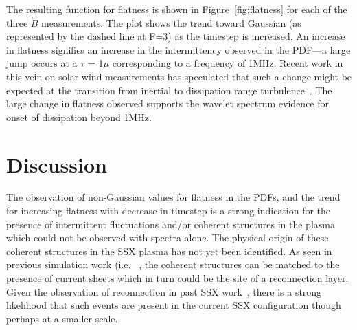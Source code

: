 \documentclass[12pt]{iopart}
\begin{document}
The resulting function for flatness is shown in Figure~\ref{fig:flatness} for each of the three $\dot{B}$ measurements. The plot shows the trend toward Gaussian (as represented by the dashed line at F=3) as the timestep is increased. An increase in flatness signifies an increase in the intermittency observed in the PDF---a large jump occurs at a $\tau$ = 1$\mu$ corresponding to a frequency of 1MHz. Recent work in this vein on solar wind measurements has speculated that such a change might be expected at the transition from inertial to dissipation range turbulence~\cite{wan12_apj}. The large change in flatness observed supports the wavelet spectrum evidence for onset of dissipation beyond 1MHz.

\section{Discussion}

The observation of non-Gaussian values for flatness in the PDFs, and the trend for increasing flatness with decrease in timestep is a strong indication for the presence of intermittent fluctuations and/or coherent structures in the plasma which could not be observed with spectra alone. The physical origin of these coherent structures in the SSX plasma has not yet been identified. As seen in previous simulation work (i.e. ~\cite{Servidio11b}, the coherent structures can be matched to the presence of current sheets which in turn could be the site of a reconnection layer. Given the observation of reconnection in past SSX work~\cite{Cothran09,Gray10}, there is a strong likelihood that such events are present in the current SSX configuration though perhaps at a smaller scale.
\end{document}
